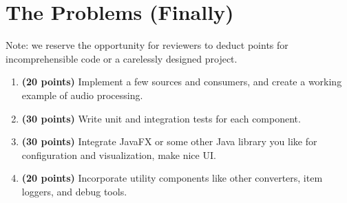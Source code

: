 \documentclass[a4paper,12pt]{article}
\begin{document}
\section{The Problems (Finally)}
Note: we reserve the opportunity for reviewers to deduct points
for incomprehensible code or a carelessly designed project.
\begin{enumerate}
  \item \textbf{(20 points)} Implement a few sources and consumers,
  and create a working example of audio processing.

  \item \textbf{(30 points)} Write unit and integration tests for each component.

  \item \textbf{(30 points)} Integrate JavaFX or some other Java library you like
  for configuration and visualization, make nice UI.

  \item \textbf{(20 points)} Incorporate utility components like other converters,
  item loggers, and debug tools.
\end{enumerate}
\end{document}
